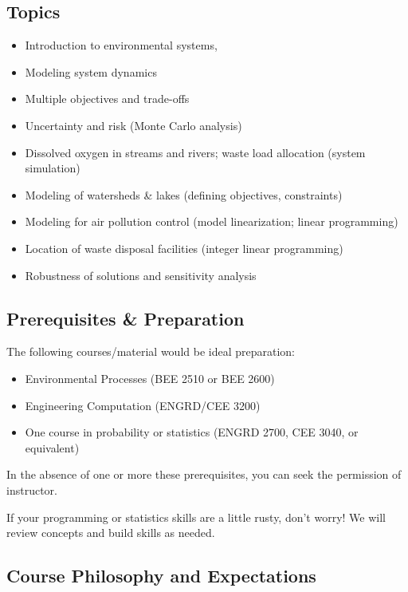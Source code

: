 \documentclass[
  letterpaper,
  DIV=11,
  numbers=noendperiod]{scrartcl}
\providecommand{\tightlist}{%
  \setlength{\itemsep}{0pt}\setlength{\parskip}{0pt}}\usepackage{longtable,booktabs,array}
\begin{document}
\hypertarget{topics}{%
\subsection{Topics}\label{topics}}

\begin{itemize}
\tightlist
\item
  Introduction to environmental systems,
\item
  Modeling system dynamics
\item
  Multiple objectives and trade-offs
\item
  Uncertainty and risk (Monte Carlo analysis)
\item
  Dissolved oxygen in streams and rivers; waste load allocation (system
  simulation)
\item
  Modeling of watersheds \& lakes (defining objectives, constraints)
\item
  Modeling for air pollution control (model linearization; linear
  programming)
\item
  Location of waste disposal facilities (integer linear programming)
\item
  Robustness of solutions and sensitivity analysis
\end{itemize}

\hypertarget{prerequisites-preparation}{%
\subsection{Prerequisites \&
Preparation}\label{prerequisites-preparation}}

The following courses/material would be ideal preparation:

\begin{itemize}
\tightlist
\item
  Environmental Processes (BEE 2510 or BEE 2600)
\item
  Engineering Computation (ENGRD/CEE 3200)
\item
  One course in probability or statistics (ENGRD 2700, CEE 3040, or
  equivalent)
\end{itemize}

In the absence of one or more these prerequisites, you can seek the
permission of instructor.

If your programming or statistics skills are a little rusty, don't
worry! We will review concepts and build skills as needed.

\hypertarget{course-philosophy-and-expectations}{%
\subsection{Course Philosophy and
Expectations}\label{course-philosophy-and-expectations}}
\end{document}
